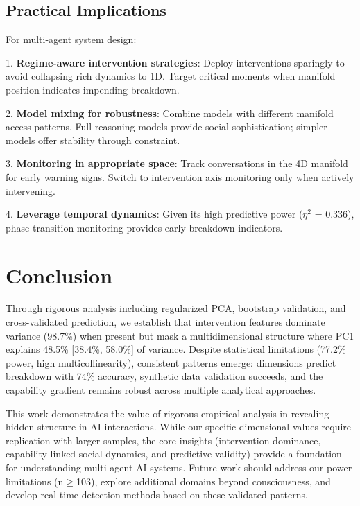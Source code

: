 \documentclass[11pt,letterpaper]{article}
\newcommand{\powerOutcomeGroups}{77.2\%}
\newcommand{\sampleSizeForeightyPower}{103}
\newcommand{\allFeaturesPCOne}{98.7\%}  %
\newcommand{\nonInterventionPCOneVariance}{48.5\%}  %
\newcommand{\nonInterventionPCOneCILower}{38.4\%}
\newcommand{\nonInterventionPCOneCIUpper}{58.0\%}
\newcommand{\temporalDynamicsEtaSquared}{0.336}
\begin{document}
\subsection{Practical Implications}

For multi-agent system design:

1. \textbf{Regime-aware intervention strategies}: Deploy interventions sparingly to avoid collapsing rich dynamics to 1D. Target critical moments when manifold position indicates impending breakdown.

2. \textbf{Model mixing for robustness}: Combine models with different manifold access patterns. Full reasoning models provide social sophistication; simpler models offer stability through constraint.

3. \textbf{Monitoring in appropriate space}: Track conversations in the 4D manifold for early warning signs. Switch to intervention axis monitoring only when actively intervening.

4. \textbf{Leverage temporal dynamics}: Given its high predictive power ($\eta^2$ = \temporalDynamicsEtaSquared{}), phase transition monitoring provides early breakdown indicators.

\section{Conclusion}

Through rigorous analysis including regularized PCA, bootstrap validation, and cross-validated prediction, we establish that intervention features dominate variance (\allFeaturesPCOne{}) when present but mask a multidimensional structure where PC1 explains \nonInterventionPCOneVariance{} [\nonInterventionPCOneCILower{}, \nonInterventionPCOneCIUpper{}] of variance. Despite statistical limitations (\powerOutcomeGroups{} power, high multicollinearity), consistent patterns emerge: dimensions predict breakdown with 74\% accuracy, synthetic data validation succeeds, and the capability gradient remains robust across multiple analytical approaches.

This work demonstrates the value of rigorous empirical analysis in revealing hidden structure in AI interactions. While our specific dimensional values require replication with larger samples, the core insights (intervention dominance, capability-linked social dynamics, and predictive validity) provide a foundation for understanding multi-agent AI systems. Future work should address our power limitations (n$\geq$\sampleSizeForeightyPower{}), explore additional domains beyond consciousness, and develop real-time detection methods based on these validated patterns.



\end{document}
